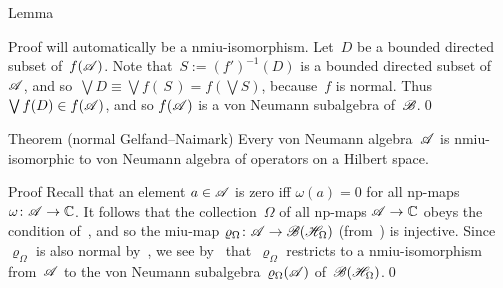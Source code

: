 \documentclass[a]{subfiles}
\begin{document}
\begin{parsec}
\begin{point}{Lemma}
\begin{point}{Proof}
will automatically be a nmiu-isomorphism.
Let~$D$ be a bounded directed subset of~$f(\mathscr{A})$.
Note that~$S:=(f')^{-1}(D)$ is a bounded
directed subset of~$\mathscr{A}$,
and so~$\bigvee D\equiv  \bigvee f(\,S\,)
= f(\bigvee S)$, because~$f$ is normal.
Thus~$\bigvee f(D)\in f(\mathscr{A})$,
and so $f(\mathscr{A})$ is a von Neumann subalgebra of~$\mathscr{B}$.\qed
\end{point}
\end{point}
\begin{point}[ngns]{Theorem (normal Gelfand--Naimark)}%
Every von Neumann algebra~$\mathscr{A}$ is nmiu-isomorphic
to von Neumann algebra of operators on a Hilbert space.
\begin{point}{Proof}%
Recall that an element $a\in \mathscr{A}$ is zero iff $\omega(a)=0$
for all np-maps $\omega\colon \mathscr{A}\to\mathbb{C}$.
It follows that the collection~$\Omega$
of all np-maps $\mathscr{A}\to\mathbb{C}$
obeys the condition of~,
and so the miu-map $\varrho_\Omega\colon \mathscr{A}\to\mathscr{B}(\mathscr{H}_\Omega)$
(from~)
is injective.
Since~$\varrho_\Omega$
is also normal by~,
we see by~ that~$\varrho_\Omega$
restricts to a nmiu-isomorphism
from~$\mathscr{A}$ to the von Neumann subalgebra~$\varrho_\Omega(\mathscr{A})$
of~$\mathscr{B}(\mathscr{H}_\Omega)$.\qed
\end{point}
\end{point}
\end{parsec}
\end{document}
